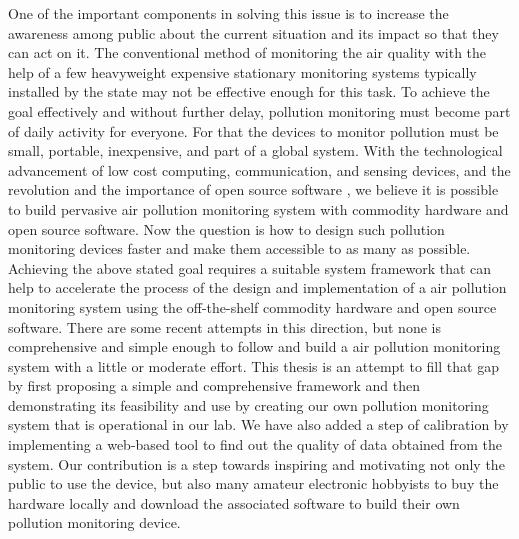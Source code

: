 One of the important components in solving this issue is to increase the awareness among public about the current situation and its impact so that they can act on it. The conventional method of monitoring the air quality with the help of a few heavyweight expensive stationary monitoring systems typically installed by the state may not be effective enough for this task. To achieve the goal effectively and without further delay, pollution monitoring must become part of daily activity for everyone. For that the devices to monitor pollution must be small, portable, inexpensive, and part of a global system. With the technological advancement of low cost computing, communication, and sensing devices, and the revolution and the importance of open source software \cite{Anthes2016}, we believe it is possible to build pervasive air pollution monitoring system with commodity hardware and open source software. Now the question is how to design such pollution monitoring devices faster and make them accessible to as many as possible. 
\\
Achieving the above stated goal requires a suitable system framework that can help to accelerate the process of the design and implementation of a air pollution monitoring system using the off-the-shelf commodity hardware and open source software. There are some recent attempts in this direction, but none is comprehensive and simple enough to follow and build a air pollution monitoring system with a little or moderate effort. This thesis is an attempt to fill that gap by first proposing a simple and comprehensive framework and then demonstrating its feasibility and use by creating our own pollution monitoring system that is operational in our lab. We have also added a step of calibration by implementing a web-based tool to find out the quality of data obtained from the system. Our contribution is a step towards inspiring and motivating not only the public to use the device, but also many amateur electronic hobbyists to buy the hardware locally and download the associated software to build their own pollution monitoring device.


